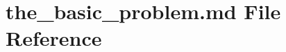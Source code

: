\hypertarget{the__basic__problem_8md}{\section{the\-\_\-basic\-\_\-problem.\-md File Reference}
\label{the__basic__problem_8md}
}
